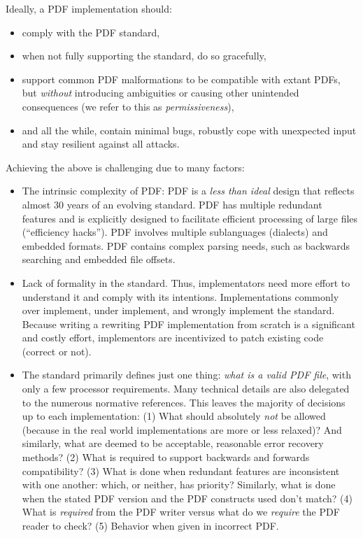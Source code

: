 Ideally, a PDF implementation should:
\begin{itemize}
\item comply with the PDF standard,
\item when not fully supporting the standard, do so gracefully,
\item support common PDF malformations
  to be compatible with extant PDFs, but \emph{without} introducing ambiguities
  or causing other unintended consequences (we refer to this as \emph{permissiveness}),
\item and all the while, contain minimal bugs, robustly cope with unexpected input and stay resilient
  against all attacks.
\end{itemize}
Achieving the above is challenging due to many factors:
\begin{itemize}
\item The intrinsic complexity of PDF:
  PDF is a \emph{less than ideal} design that reflects almost 30 years of
  an evolving standard.
  PDF has multiple redundant features and is explicitly designed to facilitate efficient processing of
  large files (``efficiency hacks'').
  PDF involves multiple sublanguages (dialects) and embedded formats.
  PDF contains complex parsing needs, such as backwards searching and
  embedded file offsets.
\item Lack of formality in the standard. Thus, implementators
  need more effort to understand it and comply with its intentions.
  Implementations commonly over implement, under implement,
  and wrongly implement the standard.
  Because writing a rewriting  PDF implementation from scratch is a significant and costly effort,
  implementors are incentivized to patch existing code (correct or not).
\item The standard primarily defines just one thing: \emph{what is a valid PDF file},
  with only a few processor requirements. Many technical details are also delegated to the numerous normative references.
  This leaves the majority of decisions up to each implementation:
  (1) What should absolutely \emph{not} be allowed (because in the real world
    implementations are more or less relaxed)? And similarly,
    what are deemed to be acceptable, reasonable error recovery methods?
  (2) What is required to support backwards and forwards compatibility?
  (3) What is done when redundant features are inconsistent with one
    another: which, or neither, has priority?
    Similarly, what is done when the stated PDF version and the PDF
    constructs used don't match?
  (4) What is \emph{required} from the PDF writer versus
    what do we \emph{require} the PDF reader to check?
  (5) Behavior when given in incorrect PDF.
\end{itemize}

